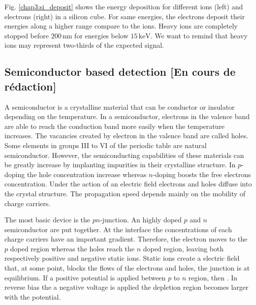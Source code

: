 \begin{refsection}
  

  Fig. \ref{chap3:si_deposit} shows the energy deposition for different ions (left) and electrons (right) in a silicon cube. For same energies, the electrons deposit their energies along a higher range compare to the ions. Heavy ions are completely stopped before $200\,\mathrm{nm}$ for energies below $15\,\mathrm{keV}$. We want to remind that heavy ions may represent two-thirds of the expected signal.

  \subsection{Semiconductor based detection  [En cours de rédaction]}
  A semiconductor is a crystalline material that can be conductor or insulator depending on the temperature. In a semiconductor, electrons in the valence band are able to reach the conduction band more easily when the temperature increases. The vacancies created by electron in the valence band are called holes. Some elements in groups III to VI of the periodic table are natural semiconductor. However, the semiconducting capabilities of these materials can be greatly increase by implanting impurities in their crystalline structure. In $p$-doping the hole concentration increase whereas $n$-doping boosts the free electrons concentration. Under the action of an electric field electrons and holes diffuse into the crystal structure. The propagation speed depends mainly on the mobility of charge carriers.

  The most basic device is the $pn$-junction. An highly doped $p$ and $n$ semiconductor are put together. At the interface the concentrations of each charge carriers have an important gradient. Therefore, the electron moves to the $p$ doped region whereas the holes reach the $n$ doped region, leaving both respectively positive and negative static ions.
  Static ions create a electric field that, at some point, blocks the flows of the electrons and holes, the junction is at equilibrium.
  If a positive potential is applied between $p$ to $n$ region, then . 
  In reverse bias the a negative voltage is applied the depletion region becomes larger with the potential.


\end{refsection}
